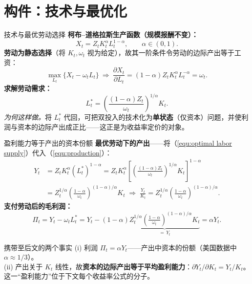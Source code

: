 \documentclass{beamer}
\begin{document}
\section{构件：技术与最优化}

\begin{frame}{技术与最优劳动选择}
	\textbf{柯布--道格拉斯生产函数（规模报酬不变）：}
	\begin{equation}\label{equ:production}
		X_t = Z_t K_t^\alpha L_t^{1-\alpha},\qquad \alpha\in(0,1).
	\end{equation}
	\textbf{劳动为静态选择}（将 $K_t,\omega_t$ 视为给定），故其一阶条件令劳动的边际产出等于工资：
	\begin{equation*}
		\max_{L_t}\{X_t-\omega_t L_t\}\ \Rightarrow\ \frac{\partial X_t}{\partial L_t}=(1-\alpha)Z_tK_t^\alpha L_t^{-\alpha}=\omega_t.
	\end{equation*}
	\textbf{求解劳动需求：}
	\begin{equation}\label{equ:optimal labor supply}
		L_t^*=\left(\frac{(1-\alpha)Z_t}{\omega_t}\right)^{1/\alpha}K_t.
	\end{equation}
	\vspace{2pt}
	\textit{为何这样做。}将 $L_t^*$ 代回，可把双投入的技术化为\textbf{单状态}（仅资本）问题，并使利润与资本的边际产出成正比——这正是为收益率定价的对象。
\end{frame}

\begin{frame}{盈利能力等于产出的资本份额}
	\textbf{最优劳动下的产出}——将（\ref{equ:optimal labor supply}）代入（\ref{equ:production}）：
	\begin{equation*}
		\begin{aligned}
			Y_t &= Z_t K_t^\alpha (L_t^*)^{1-\alpha}
			= Z_t K_t^\alpha\left[\left(\tfrac{(1-\alpha)Z_t}{\omega_t}\right)^{1/\alpha}K_t\right]^{1-\alpha}\\
			&= Z_t^{1/\alpha}\left(\frac{1-\alpha}{\omega_t}\right)^{(1-\alpha)/\alpha}K_t
			\;\Rightarrow\; \frac{Y_t}{K_t}=Z_t^{1/\alpha}\left(\frac{1-\alpha}{\omega_t}\right)^{(1-\alpha)/\alpha}.
		\end{aligned}
	\end{equation*}
	\textbf{支付劳动后的毛利润：}
	\begin{equation}\label{equ: gross profit}
		\Pi_t=Y_t-\omega_t L_t^* = Y_t-(1-\alpha)\underbrace{Z_t^{1/\alpha}\!\left(\tfrac{1-\alpha}{\omega_t}\right)^{(1-\alpha)/\alpha}K_t}_{=\,Y_t}=\alpha Y_t.
	\end{equation}
	\begin{block}{携带至后文的两个事实}
		(i) 利润 $\Pi_t=\alpha Y_t$——产出中资本的份额（美国数据中 $\alpha\approx 1/3$）。 \\
		(ii) 产出关于 $K_t$ 线性，故\textbf{资本的边际产出等于平均盈利能力}：$\partial Y_t/\partial K_t = Y_t/K_t$。这一“盈利能力”位于下文每个收益率公式的分子。
	\end{block}
\end{frame}
\end{document}
